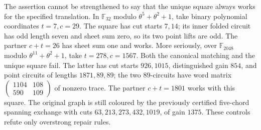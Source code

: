 \documentclass[11pt,a4paper]{article}
\theoremstyle{definition}
\theoremstyle{remark}
\begin{document}
The assertion cannot be strengthened to say that the unique square always works for the specified translation.  In $\mathbb F_{32}$ modulo $\theta^5+\theta^2+1$, take binary polynomial coordinates $t=7,c=29$.  The square has cut starts $7,14$; its inner folded circuit has odd length seven and sheet sum zero, so its two point lifts are odd.  The partner $c+t=26$ has sheet sum one and works.  More seriously, over $\mathbb F_{2048}$ modulo $\theta^{11}+\theta^2+1$, take $t=278,c=1567$.  Both the canonical matching and the unique square fail.  The latter has cut starts $926,1015$, distinguished gain $854$, and point circuits of lengths $1871,89,89$; the two $89$-circuits have word matrix $\left(\begin{smallmatrix}1104&108\\590&109\end{smallmatrix}\right)$ of nonzero trace.  The partner $c+t=1801$ works with this square.  The original graph is still coloured by the previously certified five-chord spanning exchange with cuts $63,213,273,432,1019$, of gain $1375$.  These controls refute only overstrong repair rules.
\end{document}
